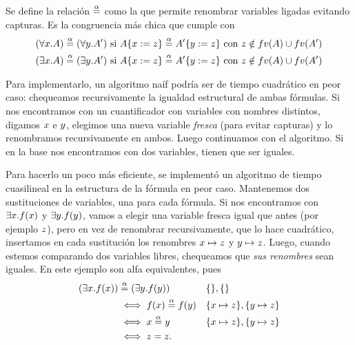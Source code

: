 \begin{definition} Se define la relación $\overset{\alpha}{=}$ como la que permite renombrar variables ligadas evitando capturas. Es la congruencia más chica que cumple con
\begin{align*}
    (\forall x . A) \overset{\alpha}{=} (\forall y . A')
        &\text{ si }
        A \{x := z\} \overset{\alpha}{=}
        A' \{y := z\} \text{ con } z \notin fv(A) \cup fv(A')
        \\
    (\exists x . A) \overset{\alpha}{=} (\exists y . A')
        &\text{ si }
        A \{x := z\} \overset{\alpha}{=}
        A' \{y := z\} \text{ con } z \notin fv(A) \cup fv(A')
        \\
\end{align*}
\end{definition}
Para implementarlo, un algoritmo naíf podría ser de tiempo cuadrático en peor caso: chequeamos recursivamente la igualdad estructural de ambas fórmulas. Si nos encontramos con un cuantificador con variables con nombres distintos, digamos $x$ e $y$, elegimos una nueva variable \textit{fresca} (para evitar capturas) y lo renombramos recursivamente en ambos. Luego continuamos con el algoritmo. Si en la base nos encontramos con dos variables, tienen que ser iguales.

Para hacerlo un poco más eficiente, se implementó un algoritmo de tiempo cuasilineal en la estructura de la fórmula en peor caso. Mantenemos dos sustituciones de variables, una para cada fórmula. Si nos encontramos con $\exists x . f(x)$ y $\exists y . f(y)$, vamos a elegir una variable fresca igual que antes (por ejemplo $z$), pero en vez de renombrar recursivamente, que lo hace cuadrático, insertamos en cada sustitución los renombres $x \mapsto z$ y $y \mapsto z$. Luego, cuando estemos comparando dos variables libres, chequeamos que \textit{sus renombres} sean iguales. En este ejemplo son alfa equivalentes, pues
\begin{align*}
    (\exists x . f(x)) &\overset{\alpha}{=} (\exists y . f(y))
    &&\{\}, \{\}
    \\
    &\iff f(x) \overset{\alpha}{=} f(y)
        &&\{x \mapsto z\}, \{y \mapsto z\}\\
    &\iff x \overset{\alpha}{=} y
        &&\{x \mapsto z\}, \{y \mapsto z\}\\
    &\iff z = z.
\end{align*}

